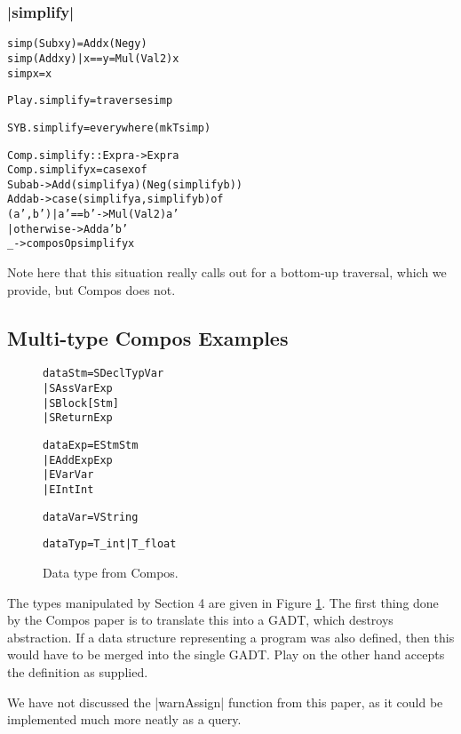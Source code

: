 \documentclass[preprint]{sigplanconf}
\newenvironment{code}{\begin{alltt}\small}{\end{alltt}}
\begin{document}
\subsubsection{|simplify|}

\begin{code}
simp (Sub x y)           = Add x (Neg y)
simp (Add x y) | x == y  = Mul (Val 2) x
simp x                   = x

Play.simplify = traverse simp

SYB.simplify = everywhere (mkT simp)

Comp.simplify :: Expr a -> Expr a
Comp.simplify x = case x of
    Sub  a b -> Add (simplify a) (Neg (simplify b))
    Add  a b -> case  (simplify a, simplify b) of
                      (a',b')  | a' == b'   -> Mul (Val 2) a'
                               | otherwise  -> Add a' b'
    _ -> composOp simplify x
\end{code}

Note here that this situation really calls out for a bottom-up traversal, which we provide, but Compos does not.


\subsection{Multi-type Compos Examples}

\begin{figure}
\begin{code}
data Stm  =  SDecl    Typ Var
          |  SAss     Var Exp
          |  SBlock   [Stm]
          |  SReturn  Exp

data Exp  =  EStm  Stm
          |  EAdd  Exp Exp
          |  EVar  Var
          |  EInt  Int

data Var  =  V String

data Typ  =  T_int | T_float
\end{code}
\caption{Data type from Compos.}
\label{fig:compos}
\end{figure}

The types manipulated by Section 4 are given in Figure \ref{fig:compos}. The first thing done by the Compos paper is to translate this into a GADT, which destroys abstraction. If a data structure representing a program was also defined, then this would have to be merged into the single GADT. Play on the other hand accepts the definition as supplied.

We have not discussed the |warnAssign| function from this paper, as it could be implemented much more neatly as a query.
\end{document}
